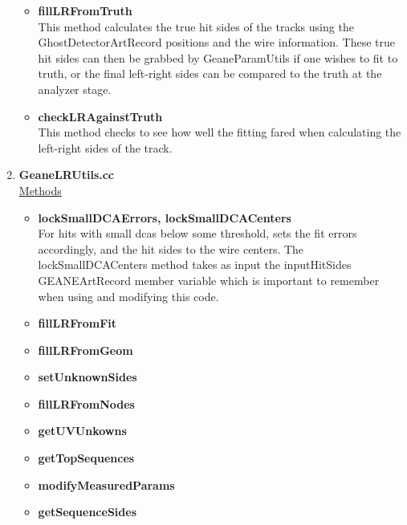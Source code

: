 \documentclass{article}
\begin{document}
\begin{enumerate}
\begin{itemize}
          \item{\bf{fillLRFromTruth}} \\
          This method calculates the true hit sides of the tracks using the GhostDetectorArtRecord positions and the wire information. These true hit sides can then be grabbed by GeaneParamUtils if one wishes to fit to truth, or the final left-right sides can be compared to the truth at the analyzer stage.

          \item{\bf{checkLRAgainstTruth}} \\
          This method checks to see how well the fitting fared when calculating the left-right sides of the track.


        \end{itemize}

      \item{\bf{GeaneLRUtils.cc}} \\


      \underline{Methods}

        \begin{itemize}

          \item{\bf{lockSmallDCAErrors, lockSmallDCACenters}} \\
          For hits with small dcas below some threshold, sets the fit errors accordingly, and the hit sides to the wire centers. The lockSmallDCACenters method takes as input the inputHitSides GEANEArtRecord member variable which is important to remember when using and modifying this code.

          \item{\bf{fillLRFromFit}} \\ 
          \item{\bf{fillLRFromGeom}} \\ 
          \item{\bf{setUnknownSides}} \\ 
          \item{\bf{fillLRFromNodes}} \\ 
          \item{\bf{getUVUnkowns}} \\ 
          \item{\bf{getTopSequences}} \\ 
          \item{\bf{modifyMeasuredParams}} \\ 
          \item{\bf{getSequenceSides}} \\ 


\end{itemize}
\end{enumerate}
\end{document}
